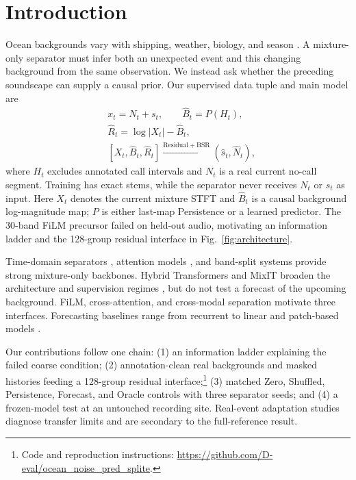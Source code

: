 \documentclass[conference]{IEEEtran}
\begin{document}
\section{Introduction}
Ocean backgrounds vary with shipping, weather, biology, and season
\cite{miksisolds2013indian}.  A mixture-only separator must infer both an
unexpected event and this changing background from the same observation.  We
instead ask whether the preceding soundscape can supply a causal prior.  Our
supervised data tuple and main model are
\begin{equation}
\begin{aligned}
 &x_t=N_t+s_t,\qquad \widehat B_t=P(H_t),\\
 &\widehat R_t=\log|X_t|-\widehat B_t,\\
 &[X_t,\widehat B_t,\widehat R_t]
 \xrightarrow{\mathrm{Residual+BSR}}(\hat s_t,\hat N_t),
\end{aligned}
\end{equation}
where $H_t$ excludes annotated call intervals and $N_t$ is a real current
no-call segment.  Training has exact stems, while the separator never receives
$N_t$ or $s_t$ as input.  Here $X_t$ denotes the current mixture STFT and
$\widehat B_t$ is a causal background log-magnitude map; $P$ is either
last-map Persistence or a learned predictor. The 30-band FiLM
precursor failed on held-out audio, motivating an information ladder and the
128-group residual interface in Fig.~\ref{fig:architecture}.

Time-domain separators \cite{luo2019convtasnet,luo2020dprnn}, attention models
\cite{subakan2021sepformer,wang2023tfgridnet}, and band-split systems
\cite{luo2023bsrnn,lu2023bsroformer} provide strong mixture-only backbones.
Hybrid Transformers and MixIT broaden the architecture and supervision regimes
\cite{rouard2023htdemucs,wisdom2020mixit}, but do not test a forecast of the
upcoming background.  FiLM, cross-attention, and cross-modal separation
\cite{perez2018film,vaswani2017attention,zhao2018pixels} motivate three
interfaces.  Forecasting baselines range from recurrent to linear and
patch-based models \cite{salinas2020deepar,oreshkin2020nbeats,zeng2023dlinear,nie2023patchtst}.

Our contributions follow one chain: (1) an information ladder explaining the
failed coarse condition; (2) annotation-clean real backgrounds and masked
histories feeding a 128-group residual interface;\footnote{Code and
reproduction instructions: \url{https://github.com/D-eval/ocean_noise_pred_splite}.}
(3) matched Zero, Shuffled, Persistence, Forecast, and Oracle controls with
three separator seeds; and (4) a frozen-model test at an untouched recording
site. Real-event adaptation studies diagnose transfer limits and are
secondary to the full-reference result.
\end{document}
